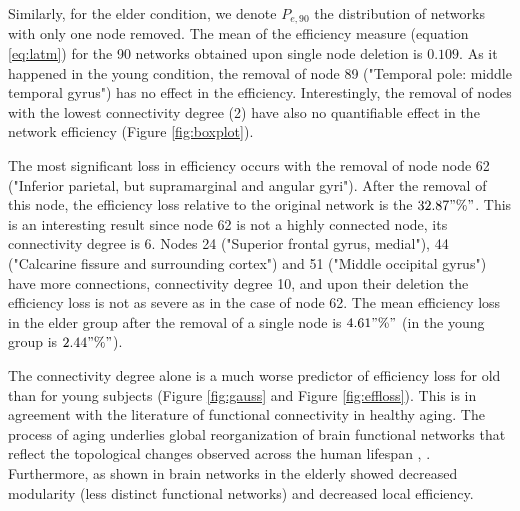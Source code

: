 \documentclass[12pt,a4paper]{article}
\begin{document}
Similarly, for the elder condition, we denote $P_{e, 90}$ the distribution of networks with only one node removed. 
The mean of the efficiency measure (equation \ref{eq:latm}) for the 90 networks obtained upon single node deletion is $0.109$. As it happened in the young condition, the removal of node 89 ("Temporal pole: middle temporal gyrus") has no effect in the efficiency. 
Interestingly, the removal of nodes with the lowest connectivity degree (2) have also no quantifiable effect in the network efficiency (Figure \ref{fig:boxplot}). 

The most significant loss in efficiency occurs with the removal of node node 62 ("Inferior parietal, but supramarginal and angular gyri"). After the removal of this node, the efficiency loss relative to the original network is the $32.87"\%"$. This is an interesting result since node 62 is not a highly connected node, its connectivity degree is 6. Nodes 24 ("Superior frontal gyrus, medial"), 44 ("Calcarine fissure and surrounding cortex") and 51 ("Middle occipital gyrus") have more connections, connectivity degree 10, and upon their deletion the efficiency loss is not as severe as in the case of node 62. 
The mean efficiency loss in the elder group after the removal of a single node is  $4.61"\%"$ (in the young group is $2.44"\%"$). 

The connectivity degree alone is a much worse predictor of efficiency loss for old than for young subjects (Figure \ref{fig:gauss} and Figure \ref{fig:effloss}). This is in agreement with the literature of functional connectivity in healthy aging. The process of aging underlies global reorganization of brain functional networks that reflect the topological changes observed across the human lifespan \cite{cao_topological_2014}, \cite{song_age-related_2014}.  
Furthermore, as shown in \cite{geerligs_brain-wide_2015} brain networks in the elderly showed decreased modularity (less distinct functional networks) and decreased local efficiency.
\end{document}
